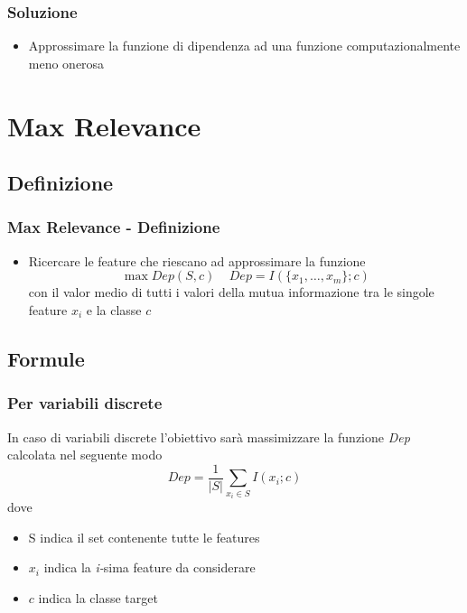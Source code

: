 \documentclass{beamer}
\begin{document}
\begin{frame}
	\frametitle{Soluzione}
	\begin{itemize}
		\item Approssimare la funzione di dipendenza ad una funzione computazionalmente meno onerosa
	\end{itemize}
\end{frame}


\section{Max Relevance}
\subsection{Definizione}
\begin{frame}
	\frametitle{Max Relevance - Definizione}
	\begin{itemize}
		\item Ricercare le feature che riescano ad approssimare la funzione 	$$ \max Dep(S,c)~~~~~ Dep = I(\{x_1,\dots,x_m \};c )$$
		con il valor medio di tutti i valori della mutua informazione tra le singole feature $x_i$ e la classe $c$
	\end{itemize}
\end{frame}
\subsection{Formule}
\begin{frame}
	\frametitle{Per variabili discrete}
	In caso di variabili discrete l'obiettivo sarà massimizzare la funzione \emph{Dep} calcolata nel seguente modo
	$$Dep= \frac{1}{|S|} \sum\limits_{x_i \in S} I (x_i;c)$$
	dove 
	\begin{itemize}
		\item S indica il set contenente tutte le features
		\item $x_i$ indica la \emph{i-}sima feature da considerare
		\item $c$ indica la classe target
	\end{itemize}
\end{frame}
\end{document}
